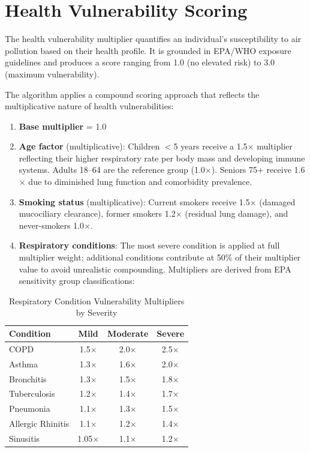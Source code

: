\documentclass[12pt,a4paper]{report}
\begin{document}
\section{Health Vulnerability Scoring}

The health vulnerability multiplier quantifies an individual's susceptibility to air pollution based on their health profile. It is grounded in EPA/WHO exposure guidelines \cite{EPA2024healtheffects, WHO2021aqg} and produces a score ranging from 1.0 (no elevated risk) to 3.0 (maximum vulnerability).

The algorithm applies a compound scoring approach that reflects the multiplicative nature of health vulnerabilities:

\begin{enumerate}[leftmargin=*]
  \item \textbf{Base multiplier} = 1.0

  \item \textbf{Age factor} (multiplicative): Children $<$5 years receive a 1.5$\times$ multiplier reflecting their higher respiratory rate per body mass and developing immune systems. Adults 18--64 are the reference group (1.0$\times$). Seniors 75+ receive 1.6$\times$ due to diminished lung function and comorbidity prevalence.

  \item \textbf{Smoking status} (multiplicative): Current smokers receive 1.5$\times$ (damaged mucociliary clearance), former smokers 1.2$\times$ (residual lung damage), and never-smokers 1.0$\times$.

  \item \textbf{Respiratory conditions}: The most severe condition is applied at full multiplier weight; additional conditions contribute at 50\% of their multiplier value to avoid unrealistic compounding. Multipliers are derived from EPA sensitivity group classifications:
\end{enumerate}

\begin{table}[H]
\centering
\caption{Respiratory Condition Vulnerability Multipliers by Severity}
\label{tab:respiratory}
\begin{tabular}{lccc}
\toprule
\textbf{Condition} & \textbf{Mild} & \textbf{Moderate} & \textbf{Severe} \\
\midrule
COPD              & 1.5$\times$ & 2.0$\times$ & 2.5$\times$ \\
Asthma            & 1.3$\times$ & 1.6$\times$ & 2.0$\times$ \\
Bronchitis        & 1.3$\times$ & 1.5$\times$ & 1.8$\times$ \\
Tuberculosis      & 1.2$\times$ & 1.4$\times$ & 1.7$\times$ \\
Pneumonia         & 1.1$\times$ & 1.3$\times$ & 1.5$\times$ \\
Allergic Rhinitis & 1.1$\times$ & 1.2$\times$ & 1.4$\times$ \\
Sinusitis         & 1.05$\times$ & 1.1$\times$ & 1.2$\times$ \\
\bottomrule
\end{tabular}
\end{table}
\end{document}
